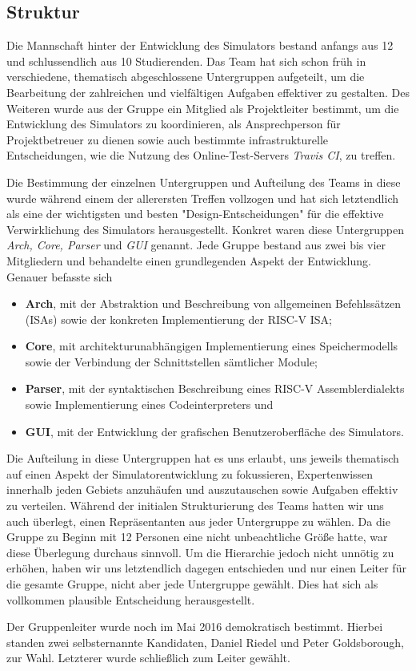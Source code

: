 
\subsection{Struktur}
\label{team:orga-structure}

Die Mannschaft hinter der Entwicklung des \erasim{} Simulators bestand anfangs
aus 12 und schlussendlich aus 10 Studierenden. Das Team hat sich schon früh in
verschiedene, thematisch abgeschlossene Untergruppen aufgeteilt, um die
Bearbeitung der zahlreichen und vielfältigen Aufgaben effektiver zu gestalten.
Des Weiteren wurde aus der Gruppe ein Mitglied als Projektleiter bestimmt, um
die Entwicklung des Simulators zu koordinieren, als Ansprechperson für
Projektbetreuer zu dienen sowie auch bestimmte infrastrukturelle Entscheidungen,
wie die Nutzung des Online-Test-Servers \emph{Travis CI}, zu treffen.

Die Bestimmung der einzelnen Untergruppen und Aufteilung des Teams in diese
wurde während einem der allerersten Treffen vollzogen und hat sich letztendlich
als eine der wichtigsten und besten "Design-Entscheidungen" für die effektive
Verwirklichung des Simulators herausgestellt. Konkret waren diese Untergruppen
\emph{Arch, Core, Parser} und \emph{GUI} genannt. Jede Gruppe bestand aus zwei
bis vier Mitgliedern und behandelte einen grundlegenden Aspekt der Entwicklung.
Genauer befasste sich

\begin{itemize}
  \item \textbf{Arch}, mit der Abstraktion und Beschreibung von allgemeinen Befehlssätzen (ISAs) sowie der konkreten Implementierung der RISC-V ISA;
  \item \textbf{Core}, mit architekturunabhängigen Implementierung eines Speichermodells sowie der Verbindung der Schnittstellen sämtlicher Module;
  \item \textbf{Parser}, mit der syntaktischen Beschreibung eines RISC-V Assemblerdialekts sowie Implementierung eines Codeinterpreters und
  \item \textbf{GUI}, mit der Entwicklung der grafischen Benutzeroberfläche des Simulators.
\end{itemize}

Die Aufteilung in diese Untergruppen hat es uns erlaubt, uns jeweils thematisch
auf einen Aspekt der Simulatorentwicklung zu fokussieren, Expertenwissen
innerhalb jeden Gebiets anzuhäufen und auszutauschen sowie Aufgaben effektiv zu
verteilen. Während der initialen Strukturierung des Teams hatten wir uns auch
überlegt, einen Repräsentanten aus jeder Untergruppe zu wählen. Da die Gruppe zu
Beginn mit 12 Personen eine nicht unbeachtliche Größe hatte, war diese
Überlegung durchaus sinnvoll. Um die Hierarchie jedoch nicht unnötig zu erhöhen,
haben wir uns letztendlich dagegen entschieden und nur einen Leiter für die
gesamte Gruppe, nicht aber jede Untergruppe gewählt. Dies hat sich als
vollkommen plausible Entscheidung herausgestellt.

Der Gruppenleiter wurde noch im Mai 2016 demokratisch bestimmt. Hierbei standen
zwei selbsternannte Kandidaten, Daniel Riedel und Peter Goldsborough, zur Wahl.
Letzterer wurde schließlich zum Leiter gewählt.
